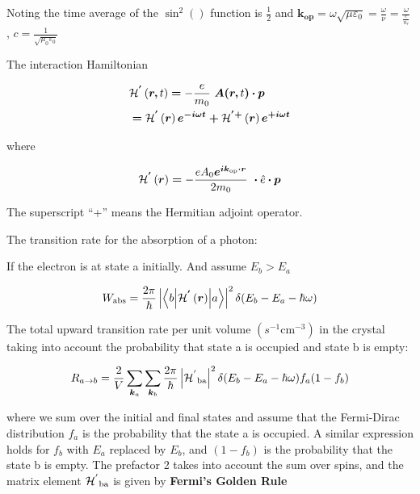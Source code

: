 Noting the time average of the \(\sin^{2}()\) function is
\(\frac{1}{2}\) and
\(\bm{k}_{\bm{\text{op}}}\bm{=}\omega\sqrt{\mu\varepsilon_{0}} = \frac{\omega}{\nu} = \frac{\omega}{\frac{c}{n_{r}}}\),
\(c = \frac{1}{\sqrt{\mu_{0}\varepsilon_{0}}}\)

The interaction Hamiltonian

\begin{eqnarray}
  & \mathcal{H}^{\bm{'}}\left( \bm{r,}t \right)\bm{=} - \frac{e}{m_{0}}\bm{\ A(r,}t\bm{) \cdot p} \nonumber \\
  & \bm{=}\mathcal{H}^{\bm{'}}\left( \bm{r} \right)\bm{e}^{\bm{- i\omega t}}\bm{+}\mathcal{H}^{\bm{' +}}\left( \bm{r} \right)\bm{e}^{\bm{+ i\omega t}}
\end{eqnarray}

where

\begin{equation}
\mathcal{H}^{\bm{'}}\left( \bm{r} \right)\bm{=} - \frac{eA_{0}\bm{e}^{\bm{i}\bm{k}_{\bm{\text{op}}}\bm{\cdot r}}}{2m_{0}}\bm{\  \cdot}\hat{e}\bm{\cdot p}
\end{equation}

The superscript ``+'' means the Hermitian adjoint operator.

The transition rate for the absorption of a photon:

If the electron is at state a initially. And assume \(E_{b} > E_{a}\)

\begin{equation}
W_{\text{abs}} = \frac{2\pi}{\hbar}\left| \left\langle b \middle| \mathcal{H}^{\bm{'}}\left( \bm{r} \right) \middle| a \right\rangle \right|^{2}\delta(E_{b} - E_{a} - \hbar\omega)
\end{equation}

The total upward transition rate per unit volume
\((s^{- 1}\text{cm}^{- 3})\) in the crystal taking into account the
probability that state a is occupied and state b is empty:

\begin{equation}
R_{a \rightarrow b} = \frac{2}{V}\sum_{\bm{k}_{a}}^{}{\sum_{\bm{k}_{b}}^{}\frac{2\pi}{\hbar}}\left| {\mathcal{H}^{'}}_{\text{ba}} \right|^{2}\delta(E_{b} - E_{a} - \hbar\omega)f_{a}(1 - f_{b})
\end{equation}

where we sum over the initial and final states and assume that the
Fermi-Dirac distribution \(f_{a}\) is the probability that the state a
is occupied. A similar expression holds for \(f_{b}\) with \(E_{a}\)
replaced by \(E_{b}\), and \(\left( 1 - f_{b} \right)\) is the
probability that the state b is empty. The prefactor 2 takes into
account the sum over spins, and the matrix element
\({\mathcal{H}^{'}}_{\text{ba}}\) is given by \textbf{Fermi's Golden Rule}

